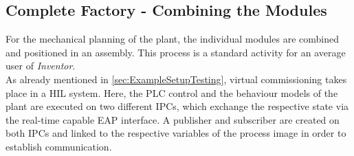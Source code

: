 %    
%  
%
%
%
	
	
\subsection{Complete Factory - Combining the Modules}
    For the mechanical planning of the plant, the individual modules are combined and positioned in an assembly. This process is a standard activity for an average user of \textit{Inventor}. \\
    
    As already mentioned in \autoref{sec:ExampleSetupTesting}, virtual commissioning takes place in a HIL system. Here, the PLC control and the behaviour models of the plant are executed on two different IPCs, which exchange the respective state via the real-time capable EAP interface. A publisher and subscriber are created on both IPCs and linked to the respective variables of the process image in order to establish communication. \\
    
